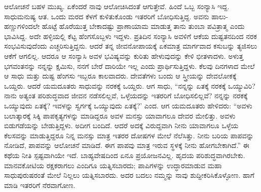 ಆಲೋಚನೆ ಬಹಳ ಮುಖ್ಯ. ಏಕೆಂದರೆ ನಾವು ಆಲೋಚಿಸಿದಂತೆ ಆಗುತ್ತೇವೆ. ಹಿಂದೆ ಒಬ್ಬ ಸಂನ್ಯಾಸಿ ಇದ್ದ. ಸಾಧುಮನುಷ್ಯ ಆತ. ಒಂದು ಮರದ ಕೆಳಗೆ ಕುಳಿತುಕೊಂಡು ಇತರರಿಗೆ ಬೋಧಿಸುತ್ತಿದ್ದ. ಅವನು ಹಾಲು-ಹಣ್ಣುಗಳಿಂದಲೇ ಹೊಟ್ಟೆ ಹೊರೆಯುತ್ತ ಬೇಕಾದಷ್ಟು ಪ್ರಾಣಾಯಾಮ ಮಾಡುತ್ತ ತಾನು ತುಂಬಾ ಪವಿತ್ರಾತ್ಮ ಎಂದು ಭಾವಿಸಿದ್ದ. ಅದೇ ಹಳ್ಳಿಯಲ್ಲಿ ಕೆಟ್ಟ ಹೆಂಗಸೊಬ್ಬಳು ಇದ್ದಳು. ಪ್ರತಿದಿನ ಸಂನ್ಯಾಸಿ ಅವಳಿಗೆ ಆಕೆಯ ದುಷ್ಟತನದಿಂದ ನರಕ ಸಂಭವಿಸುವುದೆಂದು ಎಚ್ಚರಿಸುತ್ತಿದ್ದನು. ಆದರೆ ತನ್ನ ಜೀವನೋಪಾಯಕ್ಕೆ ಏಕಮಾತ್ರ ಮಾರ್ಗವಾದ ಕಸುಬನ್ನು ತ್ಯಜಿಸಲು ಆಕೆಗೆ ಆಗಲಿಲ್ಲ. ಆದರೂ ಆ ಸಂನ್ಯಾಸಿ ಅವಳ ಭವಿಷ್ಯವನ್ನು ಕುರಿತು ಹೇಳುವುದನ್ನು ಕೇಳಿ ಭೀತಳಾದಳು. ಅಳುತ್ತ ಭಗವಂತನನ್ನು ನನ್ನನ್ನು ಕ್ಷಮಿಸು, ನನಗೆ ಬೇರೆ ದಾರಿಯೇ ಇಲ್ಲ ಎಂದು ಪ್ರಾರ್ಥಿಸುತ್ತಿದ್ದಳು. ಕೆಲವು ದಿನಗಳಾದ ಮೇಲೆ ಆ ಸಾಧು ಮತ್ತು ದುಷ್ಟ ಹೆಂಗಸು ಇಬ್ಬರೂ ಕಾಲವಾದರು. ದೇವತೆಗಳು ಬಂದು ಆ ಸ್ತ್ರೀಯನ್ನು ದೇವಲೋಕಕ್ಕೆ ಒಯ್ದರು. ಆದರೆ ಯಮದೂತರು ಸಾಧುವನ್ನು ನರಕಕ್ಕೆ ಒಯ್ದರು. ಆಗ ಸಾಧು, “ನನ್ನನ್ನು ಏತಕ್ಕೆ ನರಕಕ್ಕೆ ಒಯ್ಯುವಿರಿ? ನಾನು ಅತ್ಯಂತ ಪರಿಶುದ್ಧವಾದ ಜೀವನ ನಡೆಸಲಿಲ್ಲವೆ, ಒಳ್ಳೆಯದನ್ನು ಇತರರಿಗೆ ಬೋಧಿಸಲಿಲ್ಲವೆ? ನನ್ನನ್ನು ನರಕಕ್ಕೆ ಒಯ್ಯುವುದು ಏತಕ್ಕೆ? ಇವಳನ್ನು ಸ್ವರ್ಗಕ್ಕೆ ಒಯ್ಯುವುದು ಏತಕ್ಕೆ?' ಎಂದ. ಆಗ ಯಮದೂತರು ಹೇಳಿದರು: “ಅವಳು ಬಲಾತ್ಕಾರಕ್ಕೆ ಸಿಕ್ಕಿ ಪಾಪಕೃತ್ಯಗಳನ್ನು ಮಾಡಿದ್ದರೂ ಅವಳ ಮನಸ್ಸು ಯಾವಾಗಲೂ ದೇವರ ಮೇಲಿತ್ತು. ಅವಳು ಬಿಡುಗಡೆಯನ್ನು ಬೇಡುತ್ತಿದ್ದಳು. ಅದೀಗ ಬಂದಿದೆ. ಆದರೆ ಅದಕ್ಕೆ ವಿರುದ್ದವಾಗಿ ನೀನು ಯಾವಾಗಲೂ ಒಳ್ಳೆಯ ಕೆಲಸವನ್ನು ಮಾಡುತ್ತಿದ್ದರೂ ನಿನ್ನ ಮನಸ್ಸು ಮಾತ್ರ ಇತರರ ದೋಷಗಳ ಮೇಲೆ ನೆಲೆಸಿತ್ತು. ನೀನು ಬರಿಯ ಪಾಪವನ್ನು ನೋಡಿದೆ, ಪಾಪವನ್ನು ಆಲೋಚನೆ ಮಾಡಿದೆ. ಈಗ ಪಾಪವು ಮಾತ್ರ ಇರುವ ಸ್ಥಳಕ್ಕೆ ನೀನು ಹೋಗಬೇಕಾಗಿದೆ.'' ಈ ಕಥೆಯ ನೀತಿ ಸ್ಪಷ್ಟವಾಗಿಯೇ ಇದೆ. ಬಾಹ್ಯವೇಷದಿಂದ ಏನೂ ಪ್ರಯೋಜನವಿಲ್ಲ. ಹೃದಯ ಪರಿಶುದ್ಧವಾಗಿರಬೇಕು. ಮಾನವಕೋಟಿಯ ರಕ್ಷಕರಾಗಲು ಎಂದಿಗೂ ಯತ್ನಿಸಬಾರದು; ಪಾಪಿಗಳನ್ನು ಉದ್ಧಾರಮಾಡುವ ಮಹಾ ಸಾಧುಪುರುಷರಂತೆ ಮೇಲೆ ನಿಲ್ಲಲು ಯತ್ನಿಸಬಾರದು. ಅದರ ಬದಲು ನಮ್ಮನ್ನು ನಾವು ಶುದ್ದೀಕರಿಸಿಕೊಳ್ಳೋಣ. ಹಾಗೆ ಮಾಡಿ ಇತರರಿಗೆ ನೆರವಾಗೋಣ.

